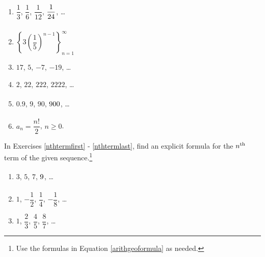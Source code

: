 \begin{multicols}{2}
\begin{enumerate}
\setcounter{enumi}{\value{HW}}


\item  $\dfrac{1}{3}$, $\dfrac{1}{6}$, $\dfrac{1}{12}$, $\dfrac{1}{24} \vphantom{\left\{ 3 \left(\dfrac{1}{5}\right)^{n-1} \right\}_{n=1}^{\infty}}$, \ldots

\item  $\left\{ 3 \left(\dfrac{1}{5}\right)^{n-1} \right\}_{n=1}^{\infty}$


\item  $17$, $5$, $-7$, $-19$, \ldots

\item  $2$, $22$, $222$, $2222$, \ldots

\item  $0.9$, $9$, $90$, $900 \vphantom{a_{n} = \dfrac{n!}{2}}$, \ldots

\item  $a_{n} = \dfrac{n!}{2}$, $n \geq 0$.  \label{alggeoneithlast}


\setcounter{HW}{\value{enumi}}
\end{enumerate}
\end{multicols}


In Exercises \ref{nthtermfirst} - \ref{nthtermlast}, find an explicit formula for the $n^{\mbox{\scriptsize th}}$ term of the given sequence.\footnote{Use the formulas in Equation \ref{arithgeoformula} as needed.}

\begin{multicols}{3}
\begin{enumerate}
\setcounter{enumi}{\value{HW}}

\item $3$, $5$, $7$, $9 \vphantom{-\dfrac{1}{8}}$, \ldots \label{nthtermfirst}
\item $1$, $-\dfrac{1}{2}$, $\dfrac{1}{4}$, $-\dfrac{1}{8}$, \ldots
\item $1$, $\dfrac{2}{3}$, $\dfrac{4}{5}$, $\dfrac{8}{7}$, \ldots

\setcounter{HW}{\value{enumi}}
\end{enumerate}
\end{multicols}

